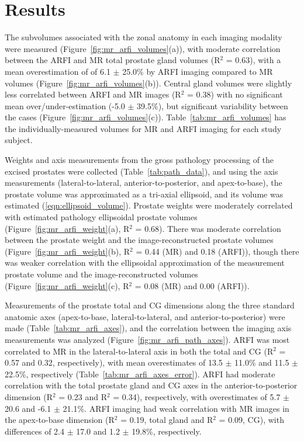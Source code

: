 \section{Results}\label{sect:results}
The subvolumes associated with the zonal anatomy in each imaging modality were
measured (Figure~\ref{fig:mr_arfi_volumes}(a)), with moderate correlation
between the ARFI and MR total prostate gland volumes (R$^2$ = 0.63), with a
mean overestimation of of 6.1 $\pm$ 25.0\% by ARFI imaging compared to MR
volumes (Figure~\ref{fig:mr_arfi_volumes}(b)).  Central gland volumes were
slightly less correlated between ARFI and MR images (R$^2$ = 0.38) with no
significant mean over/under-estimation (-5.0 $\pm$ 39.5\%), but significant
variability between the cases (Figure~\ref{fig:mr_arfi_volumes}(c)).
Table~\ref{tab:mr_arfi_volumes} has the individually-measured volumes for MR
and ARFI imaging for each study subject.



Weights and axis measurements from the gross pathology processing of the
excised prostates were collected (Table~\ref{tab:path_data}), and using the
axis measurements (lateral-to-lateral, anterior-to-posterior, and
apex-to-base), the prostate volume was approximated as a tri-axial ellipsoid,
and its volume was estimated (\ref{eqn:ellipsoid_volume}).  Prostate weights
were moderately correlated with estimated pathology ellipsoidal prostate
volumes (Figure~\ref{fig:mr_arfi_weight}(a), R$^2$ = 0.68).  There was moderate
correlation between the prostate weight and the image-reconstructed prostate
volumes (Figure~\ref{fig:mr_arfi_weight}(b), R$^2$ = 0.44 (MR) and 0.18
(ARFI)), though there was weaker correlation with the ellipsoidal approximation
of the measurement prostate volume and the image-reconstructed volumes
(Figure~\ref{fig:mr_arfi_weight}(c), R$^2$ = 0.08 (MR) and 0.00 (ARFI)).  



Measurements of the prostate total and CG dimensions along the three standard
anatomic axes (apex-to-base, lateral-to-lateral, and anterior-to-posterior)
were made (Table~\ref{tab:mr_arfi_axes}), and the correlation between the
imaging axis measurements was analyzed (Figure~\ref{fig:mr_arfi_path_axes}).
ARFI was most correlated to MR in the lateral-to-lateral axis in both the total
and CG (R$^2$ = 0.57 and 0.32, respectively), with mean overestimates of 13.5
$\pm$ 11.0\% and 11.5 $\pm$ 22.5\%, respectively
(Table~\ref{tab:mr_arfi_axes_error}).  ARFI had moderate correlation with the
total prostate gland and CG axes in the anterior-to-posterior dimension (R$^2$
= 0.23 and R$^2$ = 0.34), respectively, with overestimates of 5.7 $\pm$ 20.6
and -6.1 $\pm$ 21.1\%.  ARFI imaging had weak correlation with MR images in the
apex-to-base dimension (R$^2$ = 0.19, total gland and R$^2$ = 0.09, CG), with
differences of 2.4 $\pm$ 17.0 and 1.2 $\pm$ 19.8\%, respectively.





%

%

%
